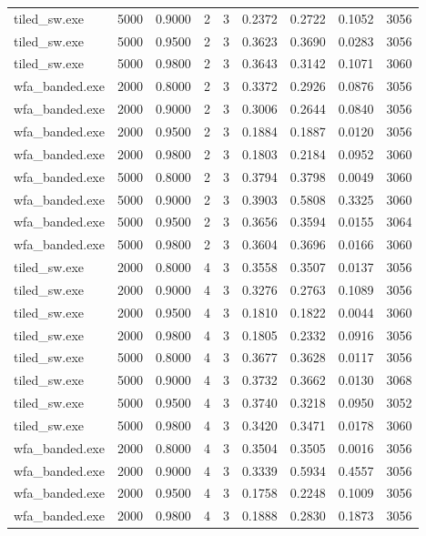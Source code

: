 \begin{tabular}{lrrrrrrrr}
tiled_sw.exe & 5000 & 0.9000 & 2 & 3 & 0.2372 & 0.2722 & 0.1052 & 3056 \\
tiled_sw.exe & 5000 & 0.9500 & 2 & 3 & 0.3623 & 0.3690 & 0.0283 & 3056 \\
tiled_sw.exe & 5000 & 0.9800 & 2 & 3 & 0.3643 & 0.3142 & 0.1071 & 3060 \\
wfa_banded.exe & 2000 & 0.8000 & 2 & 3 & 0.3372 & 0.2926 & 0.0876 & 3056 \\
wfa_banded.exe & 2000 & 0.9000 & 2 & 3 & 0.3006 & 0.2644 & 0.0840 & 3056 \\
wfa_banded.exe & 2000 & 0.9500 & 2 & 3 & 0.1884 & 0.1887 & 0.0120 & 3056 \\
wfa_banded.exe & 2000 & 0.9800 & 2 & 3 & 0.1803 & 0.2184 & 0.0952 & 3060 \\
wfa_banded.exe & 5000 & 0.8000 & 2 & 3 & 0.3794 & 0.3798 & 0.0049 & 3060 \\
wfa_banded.exe & 5000 & 0.9000 & 2 & 3 & 0.3903 & 0.5808 & 0.3325 & 3060 \\
wfa_banded.exe & 5000 & 0.9500 & 2 & 3 & 0.3656 & 0.3594 & 0.0155 & 3064 \\
wfa_banded.exe & 5000 & 0.9800 & 2 & 3 & 0.3604 & 0.3696 & 0.0166 & 3060 \\
tiled_sw.exe & 2000 & 0.8000 & 4 & 3 & 0.3558 & 0.3507 & 0.0137 & 3056 \\
tiled_sw.exe & 2000 & 0.9000 & 4 & 3 & 0.3276 & 0.2763 & 0.1089 & 3056 \\
tiled_sw.exe & 2000 & 0.9500 & 4 & 3 & 0.1810 & 0.1822 & 0.0044 & 3060 \\
tiled_sw.exe & 2000 & 0.9800 & 4 & 3 & 0.1805 & 0.2332 & 0.0916 & 3056 \\
tiled_sw.exe & 5000 & 0.8000 & 4 & 3 & 0.3677 & 0.3628 & 0.0117 & 3056 \\
tiled_sw.exe & 5000 & 0.9000 & 4 & 3 & 0.3732 & 0.3662 & 0.0130 & 3068 \\
tiled_sw.exe & 5000 & 0.9500 & 4 & 3 & 0.3740 & 0.3218 & 0.0950 & 3052 \\
tiled_sw.exe & 5000 & 0.9800 & 4 & 3 & 0.3420 & 0.3471 & 0.0178 & 3060 \\
wfa_banded.exe & 2000 & 0.8000 & 4 & 3 & 0.3504 & 0.3505 & 0.0016 & 3056 \\
wfa_banded.exe & 2000 & 0.9000 & 4 & 3 & 0.3339 & 0.5934 & 0.4557 & 3056 \\
wfa_banded.exe & 2000 & 0.9500 & 4 & 3 & 0.1758 & 0.2248 & 0.1009 & 3056 \\
wfa_banded.exe & 2000 & 0.9800 & 4 & 3 & 0.1888 & 0.2830 & 0.1873 & 3056 \\

\end{tabular}
